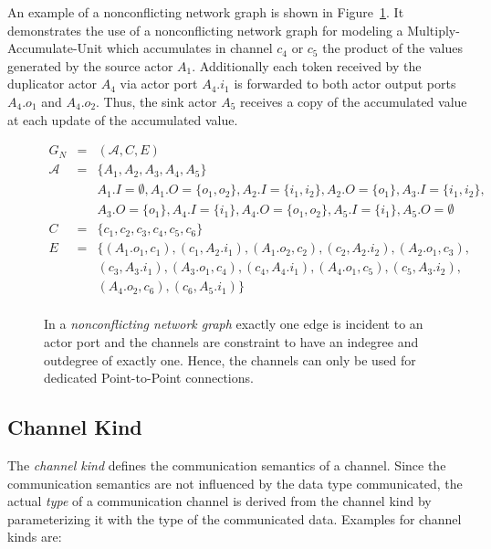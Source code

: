   An example of a nonconflicting network graph is shown in Figure~\ref{fig:ng-nonconflicting}.
  It demonstrates the use of a nonconflicting network graph for modeling
  a Multiply-Accumulate-Unit which accumulates in channel $c_4$ or $c_5$ the product of
  the values generated by the source actor $A_1$.
  Additionally each token received by the duplicator actor $A_4$ via actor port $A_4.i_1$
  is forwarded to both actor output ports $A_4.o_1$ and $A_4.o_2$.
  Thus, the sink actor $A_5$ receives a copy of the accumulated value at
  each update of the accumulated value.

\begin{figure}
\centering

\begin{displaymath}
\begin{array}{rcl}
  G_N & = & (\mathcal{A},C,E) \\
  \mathcal{A} & = & \{A_1,A_2,A_3,A_4,A_5\} \\
      &   & A_1.I = \emptyset, A_1.O=\{o_1,o_2\}, A_2.I = \{i_1,i_2\}, A_2.O=\{o_1\},A_3.I = \{i_1,i_2\},\\
      &   & A_3.O=\{o_1\},A_4.I = \{i_1\}, A_4.O=\{o_1,o_2\}, A_5.I = \{i_1\}, A_5.O=\emptyset \\
  C   & = & \{c_1,c_2,c_3,c_4,c_5,c_6\} \\
  E   & = & \{(A_1.o_1,c_1),(c_1,A_2.i_1),(A_1.o_2,c_2),(c_2,A_2.i_2),(A_2.o_1,c_3),\\
      &   &   (c_3,A_3.i_1),(A_3.o_1,c_4),(c_4,A_4.i_1),(A_4.o_1,c_5),(c_5,A_3.i_2),\\
      &   &   (A_4.o_2,c_6),(c_6,A_5.i_1)\} \\
\end{array}
\end{displaymath}
\caption{\label{fig:ng-nonconflicting} In a \emph{nonconflicting network graph} exactly
  one edge is incident to an actor port and the channels are
  constraint to have an indegree and outdegree of exactly one.
  Hence, the channels can only be used for dedicated
  Point-to-Point connections.}
\end{figure}

\subsection{Channel Kind}\label{channel-kind}

The \emph{channel kind} defines the communication semantics of a channel.
Since the communication semantics are not influenced by the
data type communicated, the actual \emph{type} of a communication
channel is derived from the channel kind by parameterizing it with
the type of the communicated data. Examples for channel kinds are:

